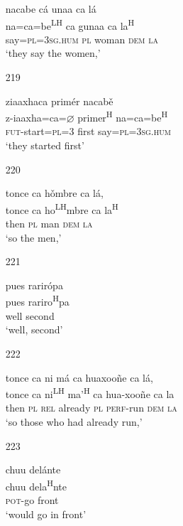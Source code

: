 \begin{itemize}
\glll   nacabe c\'{a} unaa ca l\'{a}\\
na=ca=be\textsuperscript{LH} ca gunaa ca la\textsuperscript{H}\\
say=\textsc{pl}=\textsc{3sg.hum} \textsc{pl} woman \textsc{dem} \textsc{la}\\
\glt `they say the women,'
 


\item[219]
 
\glll   ziaaxhaca prim\'{e}r nacab\v{e}\\
z-iaaxha=ca=$\varnothing$ primer\textsuperscript{H} na=ca=be\textsuperscript{H}\\
\textsc{fut}-start=\textsc{pl}=\textsc{3} first say=\textsc{pl}=\textsc{3sg.hum} \\
\glt `they started first'
 



\item[220]
 
\glll   tonce ca h\v{o}mbre ca l\'{a},\\
 tonce ca ho\textsuperscript{LH}mbre ca la\textsuperscript{H}\\
 then \textsc{pl} man \textsc{dem} \textsc{la}\\
\glt `so the men,'
 


\item[221]
 
\glll   pues rarir\'{o}pa\\
pues rariro\textsuperscript{H}pa\\
 well second\\
\glt `well, second'
 


\item[222]
 
\glll   tonce ca ni m\'{a} ca huaxoo\~{n}e ca l\'{a},\\
  tonce ca ni\textsuperscript{LH} ma'\textsuperscript{H} ca hua-xoo\~{n}e ca la\\
  then \textsc{pl} \textsc{rel} already \textsc{pl} \textsc{perf}-run \textsc{dem} \textsc{la}\\
\glt `so those who had already run,'
 


\item[223]
 
\glll   chuu del\'{a}nte \\
  chuu dela\textsuperscript{H}nte \\
    \textsc{pot}-go front\\
\glt `would go in front'
 



\end{itemize}
